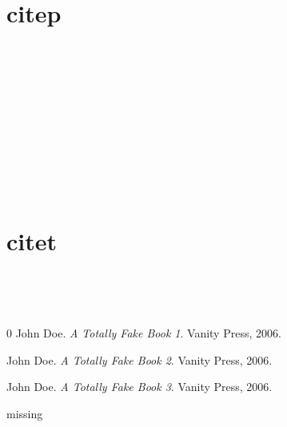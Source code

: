 
\def\mytitle{Citations}


\part{citep}
\label{citep}

~\citep{foo1}

~\citep{foo1}

~\citep[p. 123]{foo1}

~\citep{foo1}

~\citep[foo][bar]{foo1}

~\citep{foo1}~\citep{foo2}

\part{citet}
\label{citet}

\citet{foo1}

\citet{foo1}

\citet[p. 123]{foo1}

\citet{foo1}

\citet[foo][bar]{foo1}

\citet{foo1}\citet{foo2}

~\nocite{foo3}

~\citep{missing}

\begin{thebibliography}{0}
John Doe. \emph{A Totally Fake Book 1}. Vanity Press, 2006.

John Doe. \emph{A Totally Fake Book 2}. Vanity Press, 2006.

John Doe. \emph{A Totally Fake Book 3}. Vanity Press, 2006.

missing

\end{thebibliography}


